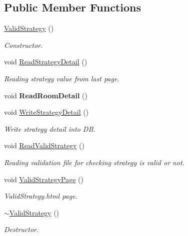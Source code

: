 \subsection*{Public Member Functions}
\begin{DoxyCompactItemize}
\item 
\hyperlink{classValidStrategy_ae168db88ebfa1eabdd7f241a631ffc27}{Valid\-Strategy} ()
\begin{DoxyCompactList}\small\item\em Constructor. \end{DoxyCompactList}\item 
void \hyperlink{classValidStrategy_ae8b17f98d81f8f70d974139086495dfa}{Read\-Strategy\-Detail} ()
\begin{DoxyCompactList}\small\item\em Reading strategy value from last page. \end{DoxyCompactList}\item 
\hypertarget{classValidStrategy_acf1a8763ec29b441c822a9ab8c80dc4b}{void {\bfseries Read\-Room\-Detail} ()}\label{classValidStrategy_acf1a8763ec29b441c822a9ab8c80dc4b}

\item 
void \hyperlink{classValidStrategy_a093620e19cef0865e6e38a26bb41b8bd}{Write\-Strategy\-Detail} ()
\begin{DoxyCompactList}\small\item\em Write strategy detail into D\-B. \end{DoxyCompactList}\item 
void \hyperlink{classValidStrategy_a234ca3ab5aa4684306148afa47b6860b}{Read\-Valid\-Strategy} ()
\begin{DoxyCompactList}\small\item\em Reading validation file for checking strategy is valid or not. \end{DoxyCompactList}\item 
void \hyperlink{classValidStrategy_ad89451a935f815b4c85b595135d70d94}{Valid\-Strategy\-Page} ()
\begin{DoxyCompactList}\small\item\em Valid\-Strategy.\-html page. \end{DoxyCompactList}\item 
\hyperlink{classValidStrategy_aec9e6ff1c9e9058a17f5488fe3e6cfec}{$\sim$\-Valid\-Strategy} ()
\begin{DoxyCompactList}\small\item\em Destructor. \end{DoxyCompactList}\end{DoxyCompactItemize}
